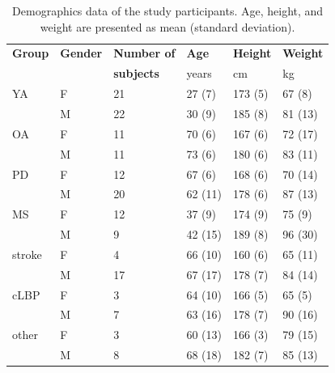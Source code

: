 \documentclass[sensors,article,submit,pdftex,moreauthors]{Definitions/mdpi}
\begin{document}
\begin{table}[H] 
	\caption{\label{tab:demographics_data}Demographics data of the study participants. Age, height, and weight are presented as mean (standard deviation).}
	\begin{tabularx}{\textwidth}{CCCCCC}
		\toprule
		\textbf{Group}	& \textbf{Gender}	& \textbf{Number of}	& \textbf{Age}	& \textbf{Height}	& \textbf{Weight}\\
		 & & \textbf{subjects} & years	& cm	& kg\\
		\midrule
		YA		& F		& 21	& 27 (7)	& 173 (5)	& 67 (8)\\
		 & M	& 22	& 30 (9)	& 185 (8) & 81 (13)\\ 
		\midrule
		OA		& F		& 11	& 70 (6)	& 167 (6)	& 72 (17)\\
		 & M	& 11	& 73 (6)	& 180 (6) & 83 (11)\\
		\midrule
		PD		& F		& 12	& 67 (6)	& 168 (6)	& 70 (14)\\
		 & M	& 20	& 62 (11)	& 178 (6) & 87 (13)\\
		\midrule
		MS		& F		& 12	& 37 (9)	& 174 (9)	& 75 (9)\\
		 & M	& 9	& 42 (15)	& 189 (8) & 96 (30)\\
		\midrule
		stroke	& F		& 4	& 66 (10)	& 160 (6)	& 65 (11)\\
		 & M	& 17	& 67 (17)	& 178 (7) & 84 (14)\\
		\midrule
		cLBP	& F		& 3	& 64 (10)	& 166 (5)	& 65 (5)\\
		 & M	& 7	& 63 (16)	& 178 (7) & 90 (16)\\ 
		\midrule
		other	& F		& 3	& 60 (13)	& 166 (3)	& 79 (15)\\
		 & M	& 8	& 68 (18)	& 182 (7) & 85 (13)\\ 
		\bottomrule
	\end{tabularx}
\end{table}
\end{document}
